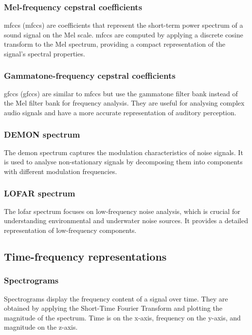 \subsubsection{Mel-frequency cepstral coefficients}
\acrlong{mfcc}s (\acrshort{mfcc}s) are coefficients that represent the short-term power spectrum of a sound signal on the Mel scale. \acrshort{mfcc}s are computed by applying a discrete cosine transform to the Mel spectrum, providing a compact representation of the signal's spectral properties.

\subsubsection{Gammatone-frequency cepstral coefficients}
\acrlong{gfcc}s (\acrshort{gfcc}s) are similar to \acrshort{mfcc}s but use the gammatone filter bank instead of the Mel filter bank for frequency analysis. They are useful for analysing complex audio signals and have a more accurate representation of auditory perception.

\subsubsection{DEMON spectrum}
The \acrfull{demon} spectrum captures the modulation characteristics of noise signals. It is used to analyse non-stationary signals by decomposing them into components with different modulation frequencies.

\subsubsection{LOFAR spectrum}
The \acrfull{lofar} spectrum focuses on low-frequency noise analysis, which is crucial for understanding environmental and underwater noise sources. It provides a detailed representation of low-frequency components.

\subsection{Time-frequency representations}

\subsubsection{Spectrograms}
Spectrograms display the frequency content of a signal over time. They are obtained by applying the Short-Time Fourier Transform and plotting the magnitude of the spectrum. Time is on the x-axis, frequency on the y-axis, and magnitude on the z-axis.

